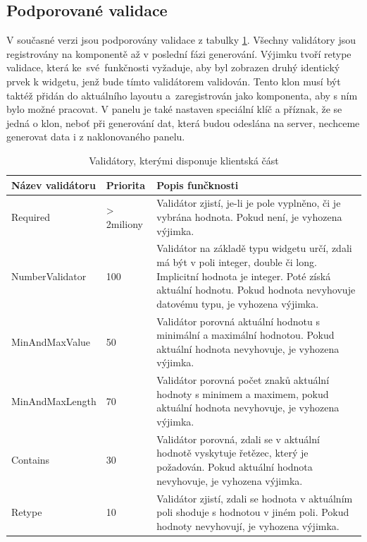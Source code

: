 \subsection{Podporované validace}
V současné verzi jsou podporovány validace z tabulky \ref{table:validations}. Všechny validátory jsou registrovány na komponentě až v poslední fázi generování. Výjimku tvoří retype validace, která ke~své~funkčnosti vyžaduje, aby byl zobrazen druhý identický prvek k widgetu, jenž bude tímto validátorem validován. Tento klon musí být taktéž přidán do aktuálního layoutu a~zaregistrován jako komponenta, aby s ním bylo možné pracovat. V panelu je také nastaven speciální klíč a příznak, že se jedná o klon, neboť při generování dat, která budou odeslána na server, nechceme generovat data i z naklonovaného panelu.
\begin{table}[width=\linewidth]
\begin{center}
\caption{Validátory, kterými disponuje klientská část}
\label{table:validations}
\begin{tabular}{|p{4cm}|p{2cm}|p{8cm}|}
\hline
\textbf{Název validátoru} & \textbf{Priorita} & \textbf{Popis funčknosti} \\
\hline
Required & > 2miliony & 
Validátor zjistí, je-li je pole vyplněno, či je vybrána hodnota. Pokud není, je vyhozena výjimka. \\
\hline
NumberValidator & 100 &
Validátor na základě typu widgetu určí, zdali má být v poli integer, double či long. Implicitní hodnota je integer. Poté získá aktuální hodnotu. Pokud hodnota nevyhovuje datovému typu, je vyhozena výjimka. \\
\hline
MinAndMaxValue & 50 &
Validátor porovná aktuální hodnotu s minimální a maximální hodnotou. Pokud aktuální hodnota nevyhovuje, je vyhozena výjimka. \\
\hline
MinAndMaxLength & 70 &
Validátor porovná počet znaků aktuální hodnoty s minimem a maximem, pokud aktuální hodnota nevyhovuje, je vyhozena výjimka. \\
\hline
Contains & 30 &
Validátor porovná, zdali se v aktuální hodnotě vyskytuje řetězec, který je požadován. Pokud aktuální hodnota nevyhovuje, je vyhozena výjimka. \\
\hline
Retype & 10 &
Validátor zjistí, zdali se hodnota v aktuálním poli shoduje s hodnotou v jiném poli. Pokud hodnoty nevyhovují, je vyhozena výjimka. \\
\hline
\end{tabular}
\end{center}
\end{table}

